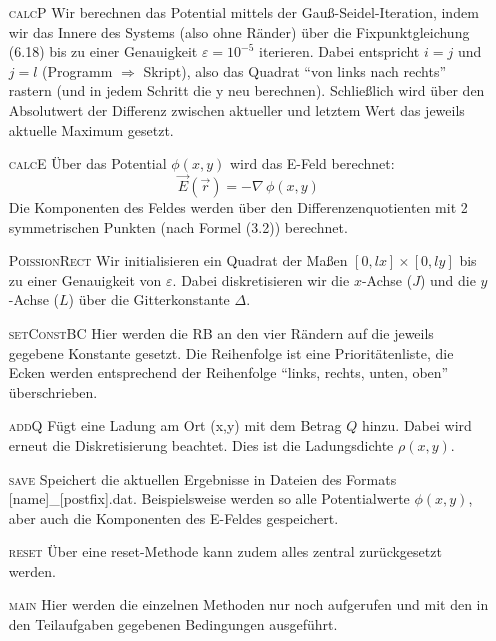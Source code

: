 \begin{enumerate}
\item[\textsc{calcP}] Wir berechnen das Potential mittels der Gauß-Seidel-Iteration, indem wir das Innere des Systems (also ohne Ränder) über die Fixpunktgleichung (6.18) bis zu einer Genauigkeit $\varepsilon = 10^{-5}$ iterieren. Dabei entspricht $i = j$ und $j = l$ (Programm $\Rightarrow$ Skript), also das Quadrat \enquote{von links nach rechts} rastern (und in jedem Schritt die y neu berechnen). Schließlich wird über den Absolutwert der Differenz zwischen aktueller und letztem Wert das jeweils aktuelle Maximum gesetzt.\\

\item[\textsc{calcE}] Über das Potential $\phi(x,y)$ wird das E-Feld berechnet:\\
\begin{equation*}
\vec{E}(\vec{r}) = - \nabla\,\phi(x,y)
\end{equation*}
Die Komponenten des Feldes werden über den Differenzenquotienten mit 2 symmetrischen Punkten (nach Formel (3.2)) berechnet.\\

\item[\textsc{PoissionRect}]
Wir initialisieren ein Quadrat der Maßen $[0,lx]\times[0,ly]$ bis zu einer Genauigkeit von $\varepsilon$. Dabei diskretisieren wir die $x$-Achse ($J$) und die $y$-Achse ($L$) über die Gitterkonstante $\Delta$.\\

\item[\textsc{setConstBC}]
Hier werden die RB an den vier Rändern auf die jeweils gegebene Konstante gesetzt. Die Reihenfolge ist eine Prioritätenliste, die Ecken werden entsprechend der Reihenfolge \enquote{links, rechts, unten, oben} überschrieben.\\

\item[\textsc{addQ}]
Fügt eine Ladung am Ort (x,y) mit dem Betrag $Q$ hinzu. Dabei wird erneut die Diskretisierung beachtet. Dies ist die Ladungsdichte $\rho(x,y)$.\\

\item[\textsc{save}]
Speichert die aktuellen Ergebnisse in Dateien des Formats \textsf{[name]\_[postfix].dat}. Beispielsweise werden so alle Potentialwerte $\phi(x,y)$, aber auch die Komponenten des E-Feldes gespeichert.\\

\item[\textsc{reset}]
Über eine reset-Methode kann zudem alles zentral zurückgesetzt werden.\\

\item[\textsc{main}]
Hier werden die einzelnen Methoden nur noch aufgerufen und mit den in den Teilaufgaben gegebenen Bedingungen ausgeführt.\\
\end{enumerate}

